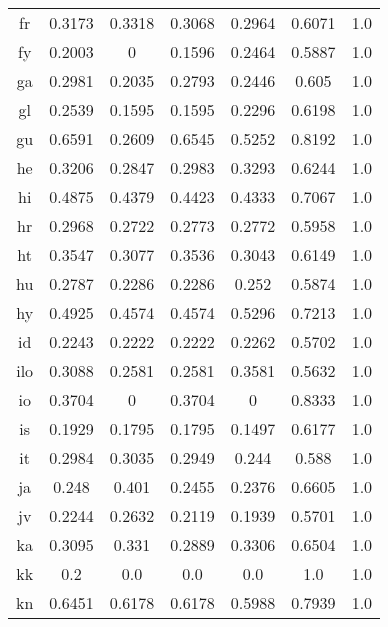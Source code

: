 \begin{figure}[h]
\begin{tabular}{ccccccc}
fr&0.3173&0.3318&0.3068&0.2964&0.6071&1.0\\
fy&0.2003&0&0.1596&0.2464&0.5887&1.0\\
ga&0.2981&0.2035&0.2793&0.2446&0.605&1.0\\
gl&0.2539&0.1595&0.1595&0.2296&0.6198&1.0\\
gu&0.6591&0.2609&0.6545&0.5252&0.8192&1.0\\
he&0.3206&0.2847&0.2983&0.3293&0.6244&1.0\\
hi&0.4875&0.4379&0.4423&0.4333&0.7067&1.0\\
hr&0.2968&0.2722&0.2773&0.2772&0.5958&1.0\\
ht&0.3547&0.3077&0.3536&0.3043&0.6149&1.0\\
hu&0.2787&0.2286&0.2286&0.252&0.5874&1.0\\
hy&0.4925&0.4574&0.4574&0.5296&0.7213&1.0\\
id&0.2243&0.2222&0.2222&0.2262&0.5702&1.0\\
ilo&0.3088&0.2581&0.2581&0.3581&0.5632&1.0\\
io&0.3704&0&0.3704&0&0.8333&1.0\\
is&0.1929&0.1795&0.1795&0.1497&0.6177&1.0\\
it&0.2984&0.3035&0.2949&0.244&0.588&1.0\\
ja&0.248&0.401&0.2455&0.2376&0.6605&1.0\\
jv&0.2244&0.2632&0.2119&0.1939&0.5701&1.0\\
ka&0.3095&0.331&0.2889&0.3306&0.6504&1.0\\
kk&0.2&0.0&0.0&0.0&1.0&1.0\\
kn&0.6451&0.6178&0.6178&0.5988&0.7939&1.0\\
\end{tabular}
\end{figure}
\clearpage
